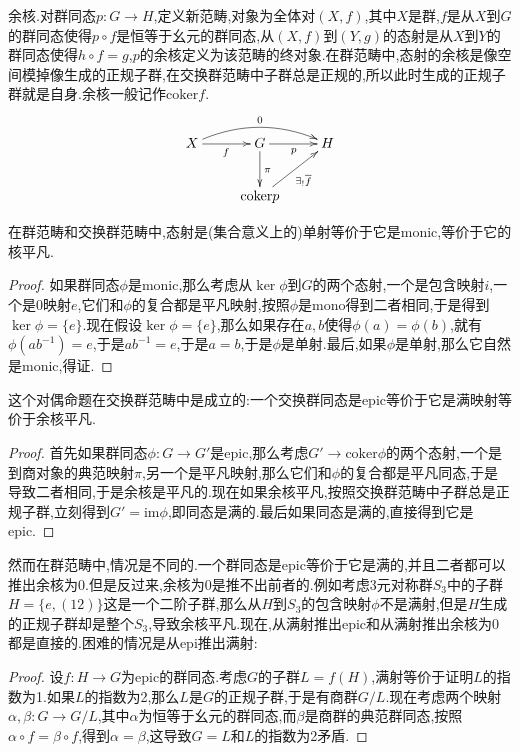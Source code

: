 \begin{enumerate}
	余核.对群同态$p:G\to H$,定义新范畴,对象为全体对$(X,f)$,其中$X$是群,$f$是从$X$到$G$的群同态使得$p\circ f$是恒等于幺元的群同态,从$(X,f)$到$(Y,g)$的态射是从$X$到$Y$的群同态使得$h\circ f=g$,$p$的余核定义为该范畴的终对象.在群范畴中,态射的余核是像空间模掉像生成的正规子群,在交换群范畴中子群总是正规的,所以此时生成的正规子群就是自身.余核一般记作$\mathrm{coker}f$.
	$$\xymatrix{X\ar[r]_f\ar@/^1pc/[rr]^0&G\ar[d]^{\pi}\ar[r]_p&H\\
		&\mathrm{coker}p\ar[ur]_{\exists_!\overline{f}}&}$$
	
	在群范畴和交换群范畴中,态射是(集合意义上的)单射等价于它是monic,等价于它的核平凡.
	\begin{proof}
		如果群同态$\phi$是monic,那么考虑从$\ker\phi$到$G$的两个态射,一个是包含映射$i$,一个是0映射$e$,它们和$\phi$的复合都是平凡映射,按照$\phi$是mono得到二者相同,于是得到$\ker\phi=\{e\}$.现在假设$\ker\phi=\{e\}$,那么如果存在$a,b$使得$\phi(a)=\phi(b)$,就有$\phi(ab^{-1})=e$,于是$ab^{-1}=e$,于是$a=b$,于是$\phi$是单射.最后,如果$\phi$是单射,那么它自然是monic,得证.
	\end{proof}
	
	这个对偶命题在交换群范畴中是成立的:一个交换群同态是epic等价于它是满映射等价于余核平凡.
	\begin{proof}
		
		首先如果群同态$\phi:G\to G'$是epic,那么考虑$G'\to\mathrm{coker}\phi$的两个态射,一个是到商对象的典范映射$\pi$,另一个是平凡映射,那么它们和$\phi$的复合都是平凡同态,于是导致二者相同,于是余核是平凡的.现在如果余核平凡,按照交换群范畴中子群总是正规子群,立刻得到$G'=\mathrm{im}\phi$,即同态是满的.最后如果同态是满的,直接得到它是epic.
	\end{proof}
	
	然而在群范畴中,情况是不同的.一个群同态是epic等价于它是满的,并且二者都可以推出余核为0.但是反过来,余核为0是推不出前者的.例如考虑3元对称群$S_3$中的子群$H=\{e,(12)\}$这是一个二阶子群,那么从$H$到$S_3$的包含映射$\phi$不是满射,但是$H$生成的正规子群却是整个$S_3$,导致余核平凡.现在,从满射推出epic和从满射推出余核为0都是直接的.困难的情况是从epi推出满射:
	\begin{proof}
		
		设$f:H\to G$为epic的群同态.考虑$G$的子群$L=f(H)$,满射等价于证明$L$的指数为1.如果$L$的指数为2,那么$L$是$G$的正规子群,于是有商群$G/L$.现在考虑两个映射$\alpha,\beta:G\to G/L$,其中$\alpha$为恒等于幺元的群同态,而$\beta$是商群的典范群同态,按照$\alpha\circ f=\beta\circ f$,得到$\alpha=\beta$,这导致$G=L$和$L$的指数为2矛盾.
		

\end{proof}
\end{enumerate}

